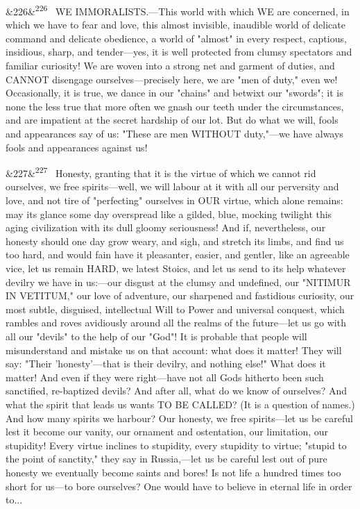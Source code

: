 \documentclass[12pt]{article}
\newcommand{\para}[1][]{\par\noindent\ifx&#1&\else\textsuperscript{\footnotesize #1}~\fi}
\begin{document}
\para[226] WE IMMORALISTS.---This world with which WE are concerned, in which we have to fear and love, this almost invisible, inaudible world of delicate command and delicate obedience, a world of "almost" in every respect, captious, insidious, sharp, and tender---yes, it is well protected from clumsy spectators and familiar curiosity! We are woven into a strong net and garment of duties, and CANNOT disengage ourselves---precisely here, we are "men of duty," even we! Occasionally, it is true, we dance in our "chains" and betwixt our "swords"; it is none the less true that more often we gnash our teeth under the circumstances, and are impatient at the secret hardship of our lot. But do what we will, fools and appearances say of us: "These are men WITHOUT duty,"---we have always fools and appearances against us!

\para[227] Honesty, granting that it is the virtue of which we cannot rid ourselves, we free spirits---well, we will labour at it with all our perversity and love, and not tire of "perfecting" ourselves in OUR virtue, which alone remains: may its glance some day overspread like a gilded, blue, mocking twilight this aging civilization with its dull gloomy seriousness! And if, nevertheless, our honesty should one day grow weary, and sigh, and stretch its limbs, and find us too hard, and would fain have it pleasanter, easier, and gentler, like an agreeable vice, let us remain HARD, we latest Stoics, and let us send to its help whatever devilry we have in us:---our disgust at the clumsy and undefined, our "NITIMUR IN VETITUM," our love of adventure, our sharpened and fastidious curiosity, our most subtle, disguised, intellectual Will to Power and universal conquest, which rambles and roves avidiously around all the realms of the future---let us go with all our "devils" to the help of our "God"! It is probable that people will misunderstand and mistake us on that account: what does it matter! They will say: "Their 'honesty'---that is their devilry, and nothing else!" What does it matter! And even if they were right---have not all Gods hitherto been such sanctified, re-baptized devils? And after all, what do we know of ourselves? And what the spirit that leads us wants TO BE CALLED? (It is a question of names.) And how many spirits we harbour? Our honesty, we free spirits---let us be careful lest it become our vanity, our ornament and ostentation, our limitation, our stupidity! Every virtue inclines to stupidity, every stupidity to virtue; "stupid to the point of sanctity," they say in Russia,---let us be careful lest out of pure honesty we eventually become saints and bores! Is not life a hundred times too short for us---to bore ourselves? One would have to believe in eternal life in order to...
\end{document}
